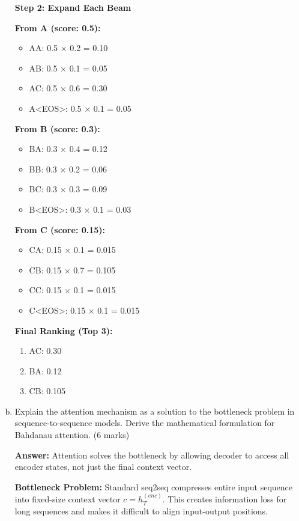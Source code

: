 \documentclass[12pt]{article}
\newcommand{\answer}[1]{{\color{answercolor}\textbf{Answer:} #1}}
\newcommand{\explanation}[1]{{\color{explanationcolor}#1}}
\begin{document}
\begin{enumerate}[(a)]
{    \textbf{Step 2: Expand Each Beam}
    
    \textbf{From A (score: 0.5):}
    \begin{itemize}
        \item AA: 0.5 × 0.2 = 0.10
        \item AB: 0.5 × 0.1 = 0.05
        \item AC: 0.5 × 0.6 = 0.30
        \item A\textless EOS\textgreater: 0.5 × 0.1 = 0.05
    \end{itemize}
    
    \textbf{From B (score: 0.3):}
    \begin{itemize}
        \item BA: 0.3 × 0.4 = 0.12
        \item BB: 0.3 × 0.2 = 0.06
        \item BC: 0.3 × 0.3 = 0.09
        \item B\textless EOS\textgreater: 0.3 × 0.1 = 0.03
    \end{itemize}
    
    \textbf{From C (score: 0.15):}
    \begin{itemize}
        \item CA: 0.15 × 0.1 = 0.015
        \item CB: 0.15 × 0.7 = 0.105
        \item CC: 0.15 × 0.1 = 0.015
        \item C\textless EOS\textgreater: 0.15 × 0.1 = 0.015
    \end{itemize}
    
    \textbf{Final Ranking (Top 3):}
    \begin{enumerate}
        \item AC: 0.30
        \item BA: 0.12
        \item CB: 0.105
    \end{enumerate}
    }
    
    \item Explain the attention mechanism as a solution to the bottleneck problem in sequence-to-sequence models. Derive the mathematical formulation for Bahdanau attention. \hfill (6 marks)
    
    \answer{Attention solves the bottleneck by allowing decoder to access all encoder states, not just the final context vector.}
    
    \explanation{
    \textbf{Bottleneck Problem:}
    Standard seq2seq compresses entire input sequence into fixed-size context vector $c = h_T^{(enc)}$. This creates information loss for long sequences and makes it difficult to align input-output positions.
    
}
\end{enumerate}
\end{document}
